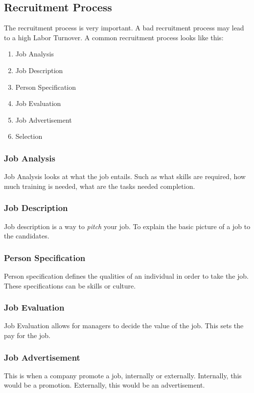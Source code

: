 \documentclass{standalone}
\begin{document}
\subsection{Recruitment Process}
The recruitment process is very important.
A bad recruitment process may lead to a high Labor Turnover.
A common recruitment process looks like this: 
\begin{enumerate}
	\item Job Analysis
	\item Job Description
	\item Person Specification
	\item Job Evaluation
	\item Job Advertisement
	\item Selection
\end{enumerate}

\subsubsection{Job Analysis}
Job Analysis looks at what the job entails.
Such as what skills are required, how much training is needed, what are the tasks needed completion.

\subsubsection{Job Description}
Job description is a way to \textit{pitch} your job.
To explain the basic picture of a job to the candidates.

\subsubsection{Person Specification}
Person specification defines the qualities of an individual in order to take the job.
These specifications can be skills or culture.

\subsubsection{Job Evaluation}
Job Evaluation allows for managers to decide the value of the job.
This sets the pay for the job.

\subsubsection{Job Advertisement}
This is when a company promote a job, internally or externally.
Internally, this would be a promotion.
Externally, this would be an advertisement.
\end{document}
